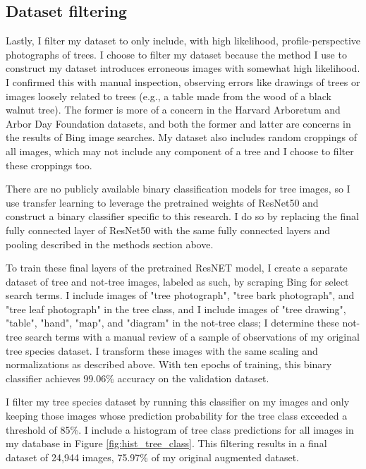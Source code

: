 \documentclass[10pt,twocolumn,letterpaper]{article}
\begin{document}
\subsection{Dataset filtering}

Lastly, I filter my dataset to only include, with high likelihood, profile-perspective photographs of trees. I choose to filter my dataset because the method I use to construct my dataset introduces erroneous images with somewhat high likelihood. I confirmed this with manual inspection, observing errors like drawings of trees or images loosely related to trees (e.g., a table made from the wood of a black walnut tree). The former is more of a concern in the Harvard Arboretum and Arbor Day Foundation datasets, and both the former and latter are concerns in the results of Bing image searches. My dataset also includes random croppings of all images, which may not include any component of a tree and I choose to filter these croppings too.

There are no publicly available binary classification models for tree images, so I use transfer learning to leverage the pretrained weights of ResNet50 and construct a binary classifier \cite{ResNET} specific to this research. I do so by replacing the final fully connected layer of ResNet50 with the same fully connected layers and pooling described in the methods section above.

To train these final layers of the pretrained ResNET model, I create a separate dataset of tree and not-tree images, labeled as such, by scraping Bing for select search terms. I include images of "tree photograph", "tree bark photograph", and "tree leaf photograph" in the tree class, and I include images of "tree drawing", "table", "hand", "map", and "diagram" in the not-tree class; I determine these not-tree search terms with a manual review of a sample of observations of my original tree species dataset. I transform these images with the same scaling and normalizations as described above. With ten epochs of training, this binary classifier achieves 99.06\% accuracy on the validation dataset. 

I filter my tree species dataset by running this classifier on my images and only keeping those images whose prediction probability for the tree class exceeded a threshold of 85\%. I include a histogram of tree class predictions for all images in my database in Figure \ref{fig:hist_tree_class}. This filtering results in a final dataset of 24,944 images, 75.97\% of my original augmented dataset.
\end{document}
